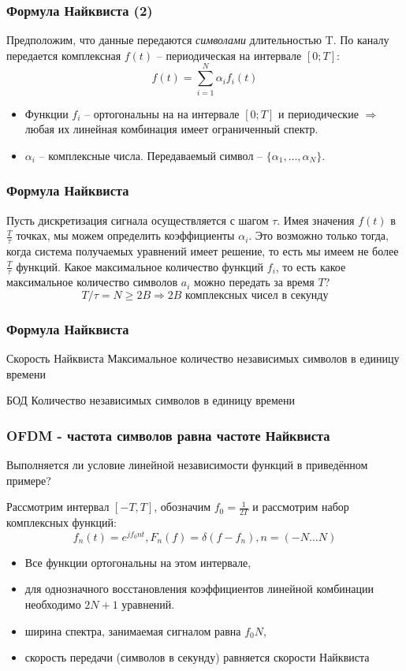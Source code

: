 \documentclass[utf8]{beamer}
\begin{document}
\begin{frame}
\frametitle{Формула Найквиста (2)}
Предположим, что данные передаются \emph{символами} длительностью T. По каналу передается комплексная $f(t)$ -- периодическая на  интервале $[0; T]$:
$$f(t) = \sum_{i=1}^{N}\alpha_i f_i(t)$$
\begin{itemize}
	\item Функции $f_i$ -- ортогональны на на интервале $[0; T]$ и периодические $\Rightarrow$ любая их линейная комбинация имеет ограниченный спектр.
	\item $\alpha_i$ -- комплексные числа. Передаваемый символ -- $\{\alpha_1,\ldots,\alpha_N\}$.
\end{itemize}
\end{frame}
\begin{frame}
\frametitle{Формула Найквиста}
Пусть дискретизация сигнала осуществляется с шагом $\tau$. Имея значения $f(t)$ в $\frac{T}{\tau}$ точках, мы можем определить коэффициенты $\alpha_i$.
Это возможно только тогда, когда система получаемых уравнений имеет решение, то есть мы имеем не более $\frac{T}{\tau}$ функций.
Какое максимальное количество функций $f_i$, то есть какое максимальное количество символов $a_i$ можно передать за время $T$?
$$
T/\tau = N \geq 2B \Rightarrow 2B \textrm{ комплексных чисел в секунду}
$$
\end{frame}
\begin{frame}
\frametitle{Формула Найквиста}
\begin{block}{Скорость Найквиста}
 Максимальное количество независимых символов в единицу времени
\end{block}
\begin{block}{БОД}
Количество независимых символов в единицу времени
\end{block}
\end{frame}
\begin{frame}
\frametitle{OFDM - частота символов равна частоте Найквиста}
Выполняется ли условие линейной независимости функций в приведённом примере?

Рассмотрим интервал $[-T, T]$, обозначим $f_0 = \frac{1}{2T}$ и рассмотрим набор комплексных функций:
$$
f_n(t) = e^{jf_0 nt}, F_n(f) = \delta (f - f_n), n=(-N\ldots N)
$$
\begin{itemize}
	\item Все функции ортогональны на этом интервале,
	\item для однозначного восстановления коэффициентов линейной комбинации необходимо $2N+1$ уравнений.
	\item ширина спектра, занимаемая сигналом равна $f_0 N$,
	\item скорость передачи (символов в секунду) равняется скорости Найквиста
\end{itemize}
\end{frame}
\end{document}
